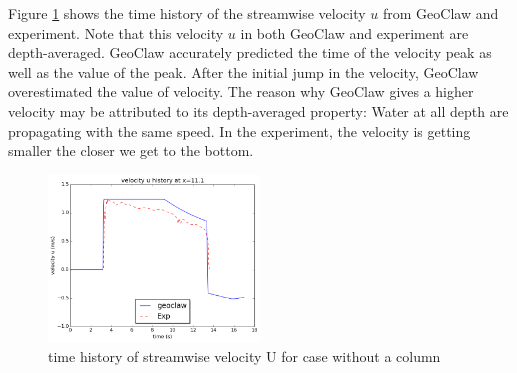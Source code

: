 \documentclass[11pt]{article}
\begin{document}
Figure \ref{fig:velocityU_nocolumn} shows the time history of the streamwise velocity $u$ from GeoClaw and experiment. 
Note that this velocity $u$ in both GeoClaw and experiment are depth-averaged. 
GeoClaw accurately predicted the time of the velocity peak as well as the value of the peak. 
After the initial jump in the velocity, GeoClaw overestimated the value of velocity.
The reason why GeoClaw gives a higher velocity may be attributed to its depth-averaged property: Water at all depth are propagating with the same speed. In the experiment, the velocity is getting smaller the closer we get to the bottom. 
\begin{figure}[h!]
    \centering
    \includegraphics[width=0.5\textwidth]{./plots/velocityU_nocolumn}
    \caption{time history of streamwise velocity U for case without a column}
    \label{fig:velocityU_nocolumn}
\end{figure}
\end{document}
